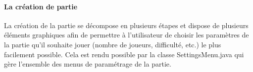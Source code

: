 \paragraph{La création de partie}

La création de la partie se décompose en plusieurs étapes et dispose de plusieurs éléments graphiques afin de permettre à l'utilisateur de choisir les paramètres de la partie qu'il souhaite jouer (nombre de joueurs, difficulté, etc.) le plus facilement possible. Cela est rendu possible par la classe SettingsMenu.java qui gère l'ensemble des menus de paramétrage de la partie.
